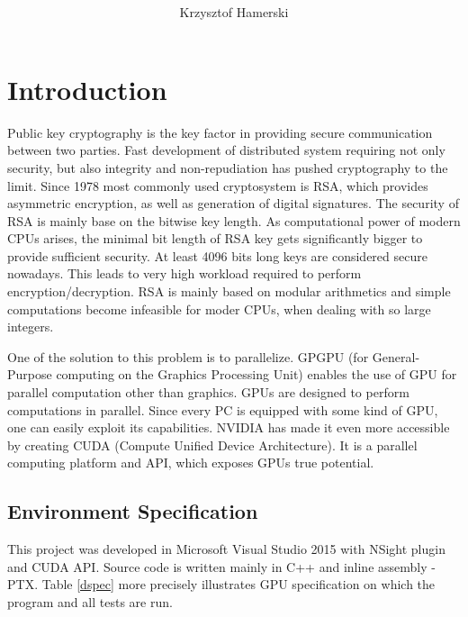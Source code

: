 \documentclass[oneside,openright,12pt,final,en]{mgr}
\title{ }
\author{Krzysztof Hamerski}
\begin{document}


\maketitle 
\tableofcontents

\chapter{Introduction}

Public key cryptography is the key factor in providing secure communication between two parties. Fast development of distributed system requiring not only security, but also integrity and non-repudiation has pushed cryptography to the limit. Since 1978\cite{rsa} most commonly used cryptosystem is RSA, which provides asymmetric encryption, as well as generation of digital signatures. The security of RSA is mainly base on the bitwise key length. As computational power of modern CPUs arises, the minimal bit length of RSA key gets significantly bigger to provide sufficient security. At least 4096 bits long keys are considered secure nowadays. This leads to very high workload required to perform encryption/decryption. RSA is mainly based on modular arithmetics and simple computations become infeasible for moder CPUs, when dealing with so large integers. 

One of the solution to this problem is to parallelize. GPGPU\cite{gpgpu} (for General-Purpose
computing on the Graphics Processing Unit) enables the use of GPU for parallel computation other than graphics. GPUs are designed to perform computations in parallel. Since every PC is equipped with some kind of GPU, one can easily exploit its capabilities.    
NVIDIA has made it even more accessible by creating CUDA (Compute Unified Device Architecture)\cite{cuda}. It is a parallel computing platform and API, which exposes GPUs true potential. 
  
\section{Environment Specification}
This project was developed in Microsoft Visual Studio 2015\cite{vs} with NSight plugin and CUDA API.\cite{cuda} Source code is written mainly in C++ and inline assembly - PTX.\cite{ptx} Table \ref{dspec} more precisely illustrates GPU specification on which the program and all tests are run.
\end{document}
